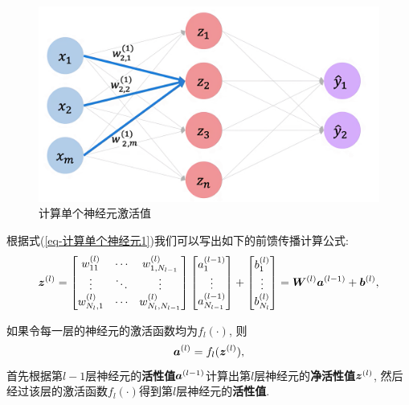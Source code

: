 \documentclass[12pt, a4paper, oneside]{ctexart}
\begin{document}
\begin{figure}[t]
    \centering
    \includegraphics[scale=0.4]{计算单个神经元.png}
    \caption{计算单个神经元激活值\protect\footnotemark[1]}
    \label{figure-计算单个神经元激活值}
\end{figure}

根据式(\ref{eq-计算单个神经元1})我们可以写出如下的前馈传播计算公式:
\begin{equation}\label{eq-计算净活性值}
    \boldsymbol{z}^{(l)} = \left[\begin{matrix}
        w_{11}^{(l)}&\cdots&w_{1,N_{l-1}}^{(l)}\\
        \vdots&\ddots&\vdots\\
        w_{N_l,1}^{(l)}&\cdots&w_{N_l,N_{l-1}}^{(l)}
    \end{matrix}\right]\left[\begin{matrix}
        a_1^{(l-1)}\\
        \vdots\\
        a_{N_{l-1}}^{(l-1)}
    \end{matrix}\right]+\left[\begin{matrix}
        b_1^{(l)}\\
        \vdots\\
        b_{N_{l}}^{(l)}
    \end{matrix}\right] = \boldsymbol{W}^{(l)}\boldsymbol{a}^{(l-1)}+\boldsymbol{b}^{(l)},
\end{equation}

如果令每一层的神经元的激活函数均为$f_l(\cdot)$, 则
\begin{equation}\label{eq-计算活性值}
    \boldsymbol{a}^{(l)} = f_l(\boldsymbol{z}^{(l)}),
\end{equation}
首先根据第$l-1$层神经元的\textbf{活性值}$\boldsymbol{a}^{(l-1)}$计算出第$l$层神经元的\textbf{净活性值}$\boldsymbol{z}^{(l)}$, 然后经过该层的激活函数$f_l(\cdot)$得到第$l$层神经元的\textbf{活性值}.
\end{document}
